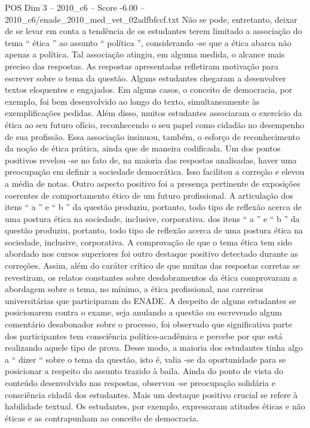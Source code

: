 \begin{textsample}{POS Dim 3 – 2010\_c6 – Score -6.00 – 2010\_c6/enade\_2010\_med\_vet\_02adfbfccf.txt}
Não se pode, entretanto, deixar de se levar em conta a tendência de os estudantes terem limitado a associação do tema “ ética ” ao assunto “ política ”, considerando -se que a ética abarca não apenas a política.
Tal associação atingiu, em alguma medida, o alcance mais preciso das respostas.
As respostas apresentadas refletiram motivação para escrever sobre o tema da questão.
Alguns estudantes chegaram a desenvolver textos eloquentes e engajados.
Em alguns casos, o conceito de democracia, por exemplo, foi bem desenvolvido ao longo do texto, simultaneamente às exemplificações pedidas.
Além disso, muitos estudantes associaram o exercício da ética ao seu futuro ofício, reconhecendo o seu papel como cidadão no desempenho de sua profissão.
Essa associação insinuou, também, o esforço de reconhecimento da noção de ética prática, ainda que de maneira codificada.
Um dos pontos positivos revelou -se no fato de, na maioria das respostas analisadas, haver uma preocupação em definir a sociedade democrática.
Isso facilitou a correção e elevou a média de notas.
Outro aspecto positivo foi a presença pertinente de exposições coerentes de comportamento ético de um futuro profissional.
A articulação dos itens “ a ” e “ b ” da questão produziu, portanto, todo tipo de reflexão acerca de uma postura ética na sociedade, inclusive, corporativa. dos itens “ a ” e “ b ” da questão produziu, portanto, todo tipo de reflexão acerca de uma postura ética na sociedade, inclusive, corporativa.
A comprovação de que o tema ética tem sido abordado nos cursos superiores foi outro destaque positivo detectado durante as correções.
Assim, além do caráter crítico de que muitas das respostas corretas se revestiram, os relatos constantes sobre desdobramentos da ética comprovaram a abordagem sobre o tema, no mínimo, a ética profissional, nas carreiras universitárias que participaram do ENADE.
A despeito de alguns estudantes se posicionarem contra o exame, seja anulando a questão ou escrevendo algum comentário desabonador sobre o processo, foi observado que significativa parte dos participantes tem consciência político-acadêmica e percebe por que está realizando aquele tipo de prova.
Desse modo, a maioria dos estudantes tinha algo a “ dizer “ sobre o tema da questão, isto é, valia -se da oportunidade para se posicionar a respeito do assunto trazido à baila.
Ainda do ponto de vista do conteúdo desenvolvido nas respostas, observou -se preocupação solidária e consciência cidadã dos estudantes.
Mais um destaque positivo crucial se refere à habilidade textual.
Os estudantes, por exemplo, expressaram atitudes éticas e não éticas e as contrapunham ao conceito de democracia.

\end{textsample}
